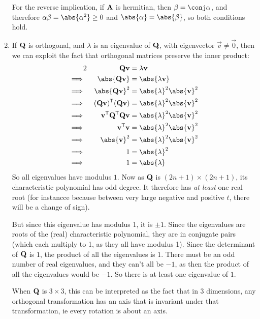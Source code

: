 \documentclass[fleqn,a4paper,11pt]{article}
\begin{document}
\begin{enumerate}[label=\textbf{\arabic*.}]
   For the reverse implication, if \(\mathbf{A}\) is hermitian, then
   \(\beta = \conj \alpha\), and therefore
   \(\alpha \beta = \abs{\alpha^2} \ge 0\)
   and \(\abs{\alpha} = \abs{\beta}\), so both conditions hold.
  \item
   If \(\mathbf{Q}\) is orthogonal, and \(\lambda\) is an eigenvalue of
   \(\mathbf{Q}\), with eigenvector \(\vec v \ne \vec 0\), then we can exploit the
   fact that orthogonal matrices preserve the inner product:
   \begin{alignat*}2
    &&\mat Q \vec v &= \lambda \vec v \\
    \implies{}&&
    \abs{\mat Q \vec v} &= \abs{\lambda \vec v} \\
    \implies{}&&
    \abs{\mat Q \vec v}^2 &= \abs{\lambda}^2 \abs{\vec v}^2 \\
    \implies{}&&
    \tran{(\mat Q \vec v)}(\mat Q \vec v) &= \abs{\lambda}^2 \abs{\vec v}^2 \\
    \implies{}&&
    \tran{\vec v}\tran{\mat Q}\mat Q \vec v &= \abs{\lambda}^2 \abs{\vec v}^2 \\
    \implies{}&&
    \tran{\vec v}\vec v &= \abs{\lambda}^2 \abs{\vec v}^2 \\
    \implies{}&&
    \abs{\vec v}^2 &= \abs{\lambda}^2 \abs{\vec v}^2 \\
    \implies{}&&
    1 &= \abs{\lambda}^2 \\
    \implies{}&&
    1 &= \abs{\lambda}
   \end{alignat*}
   So all eigenvalues have modulus \(1\). Now as \(\mathbf{Q}\) is
   \((2n + 1) \times (2n + 1)\), its characteristic polynomial has odd degree.
   It therefore has \emph{at least} one real root (for instancce because between
   very large negative and positive \(t\), there will be a change of sign).

   But since this eigenvalue has modulus \(1\), it is \(\pm 1\). Since the
   eigenvalues are roots of the (real) characteristic polynomial, they are in
   conjugate pairs (which each multiply to 1, as they all have modulus 1). Since
   the determinant of \(\mathbf{Q}\) is \(1\), the product of all the eigenvalues is
   \(1\). There must be an odd number of real eigenvalues, and they can't all be
   \(-1\), as then the product of all the eigenvalues would be \(-1\). So there
   is at least one eigenvalue of \(1\).

   When \(\mathbf{Q}\) is \(3 \times 3\), this can be interpreted as the fact that
   in \(3\) dimensions, any orthogonal transformation has an axis that is
   invariant under that transformation, ie every rotation is about an axis.


\end{enumerate}
\end{document}
